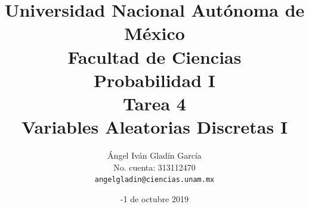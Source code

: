 \documentclass[11pt,letterpaper]{report}
\begin{document}
\title{
        Universidad Nacional Autónoma de México\\
        Facultad de Ciencias\\
        Probabilidad I\\
    \vspace{1cm}
    \large
        \textbf{Tarea 4}\\
        \textbf{Variables Aleatorias Discretas I}
}
\author{
    Ángel Iván Gladín García\\
    No. cuenta: 313112470\\
    \texttt{angelgladin@ciencias.unam.mx}
}
\date{-1 de octubre 2019}
\maketitle

\newtheorem{theorem}{Teorema}
\newtheorem{example}{Ejemplo}
\newtheorem{corollary}{Corolario}
\newtheorem{lemma}{Lemma}
\newtheorem{definition}{Definicion}
\newtheorem{prop}{Proposicion}
\end{document}

